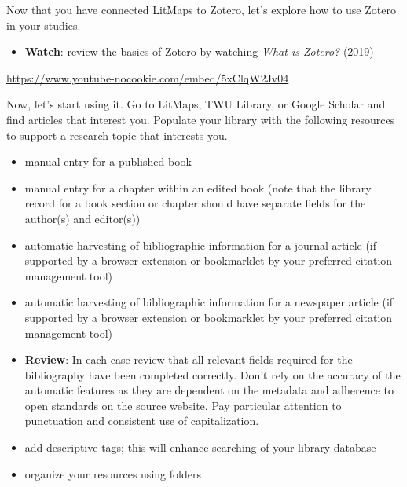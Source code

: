 \documentclass[
  letterpaper,
  DIV=11,
  numbers=noendperiod]{scrreprt}
\providecommand{\tightlist}{%
  \setlength{\itemsep}{0pt}\setlength{\parskip}{0pt}}\usepackage{longtable,booktabs,array}
\begin{document}
\begin{tcolorbox}[enhanced jigsaw, toprule=.15mm, colback=white, colframe=quarto-callout-note-color-frame, bottomtitle=1mm, leftrule=.75mm, coltitle=black, titlerule=0mm, rightrule=.15mm, colbacktitle=quarto-callout-note-color!10!white, left=2mm, title={Learning Activity}, opacitybacktitle=0.6, opacityback=0, breakable, toptitle=1mm, arc=.35mm, bottomrule=.15mm]

Now that you have connected LitMaps to Zotero, let's explore how to use
Zotero in your studies.

\begin{itemize}
\tightlist
\item
  \textbf{Watch}: review the basics of Zotero by watching
  \href{https://www.youtube.com/watch?v=5xClqW2Jv04}{\emph{What is
  Zotero?}} (2019)
\end{itemize}

\url{https://www.youtube-nocookie.com/embed/5xClqW2Jv04}

Now, let's start using it. Go to LitMaps, TWU Library, or Google Scholar
and find articles that interest you. Populate your library with the
following resources to support a research topic that interests you.

\begin{itemize}
\tightlist
\item
  manual entry for a published book
\item
  manual entry for a chapter within an edited book (note that the
  library record for a book section or chapter should have separate
  fields for the author(s) and editor(s))
\item
  automatic harvesting of bibliographic information for a journal
  article (if supported by a browser extension or bookmarklet by your
  preferred citation management tool)
\item
  automatic harvesting of bibliographic information for a newspaper
  article (if supported by a browser extension or bookmarklet by your
  preferred citation management tool)
\item
  \textbf{Review}: In each case review that all relevant fields required
  for the bibliography have been completed correctly. Don't rely on the
  accuracy of the automatic features as they are dependent on the
  metadata and adherence to open standards on the source website. Pay
  particular attention to punctuation and consistent use of
  capitalization.
\item
  add descriptive tags; this will enhance searching of your library
  database
\item
  organize your resources using folders
\end{itemize}


\end{tcolorbox}
\end{document}
